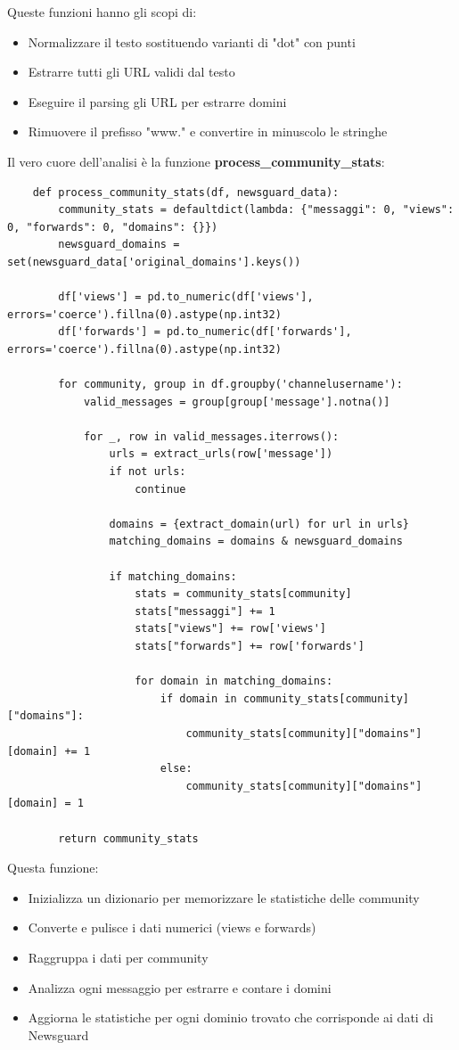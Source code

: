 \documentclass[12pt]{article}
\begin{document}
	Queste funzioni hanno gli scopi di:
	\begin{itemize}[label=]
		\item Normalizzare il testo sostituendo varianti di "dot" con punti
		\item Estrarre tutti gli URL validi dal testo
		\item Eseguire il parsing gli URL per estrarre domini
		\item Rimuovere il prefisso "www." e convertire in minuscolo le stringhe
	\end{itemize}
	Il vero cuore dell'analisi è la funzione \textbf{process\_community\_stats}:
	\begin{lstlisting}
	def process_community_stats(df, newsguard_data):
		community_stats = defaultdict(lambda: {"messaggi": 0, "views": 0, "forwards": 0, "domains": {}})
		newsguard_domains = set(newsguard_data['original_domains'].keys())
		
		df['views'] = pd.to_numeric(df['views'], errors='coerce').fillna(0).astype(np.int32)
		df['forwards'] = pd.to_numeric(df['forwards'], errors='coerce').fillna(0).astype(np.int32)
		
		for community, group in df.groupby('channelusername'):
			valid_messages = group[group['message'].notna()]
		
			for _, row in valid_messages.iterrows():
				urls = extract_urls(row['message'])
				if not urls:
					continue
		
				domains = {extract_domain(url) for url in urls}
				matching_domains = domains & newsguard_domains
		
				if matching_domains:
					stats = community_stats[community]
					stats["messaggi"] += 1
					stats["views"] += row['views']
					stats["forwards"] += row['forwards']
		
					for domain in matching_domains:
						if domain in community_stats[community]["domains"]:
							community_stats[community]["domains"][domain] += 1
						else:
							community_stats[community]["domains"][domain] = 1
		
		return community_stats
	\end{lstlisting}
	Questa funzione:
	\begin{itemize}[label=]
		\item Inizializza un dizionario per memorizzare le statistiche delle community
		\item Converte e pulisce i dati numerici (views e forwards)
		\item Raggruppa i dati per community
		\item Analizza ogni messaggio per estrarre e contare i domini
		\item Aggiorna le statistiche per ogni dominio trovato che corrisponde ai dati di Newsguard
	\end{itemize}
\end{document}
